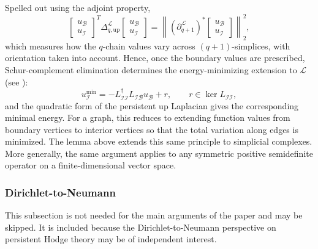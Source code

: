 \documentclass{article}
\newcommand{\LL}{\mathcal{L}}
\begin{document}
Spelled out using the adjoint property,
\[
\begin{bmatrix}u_{\mathcal{B}}\\u_{\mathcal{I}}\end{bmatrix}^T\Delta_{q,\mathrm{up}}^\LL\begin{bmatrix}u_{\mathcal{B}}\\u_{\mathcal{I}}\end{bmatrix}=\left\|(\partial_{q+1}^\LL)^*\begin{bmatrix}u_{\mathcal{B}}\\u_{\mathcal{I}}\end{bmatrix}\right\|_2^2,
\]
which measures how the $q$-chain values vary across $(q+1)$-simplices, with orientation taken into account. Hence, once the boundary values are prescribed, Schur-complement elimination determines the energy-minimizing extension to $\LL$ (see \cite[Appendix A.5.5]{MR2061575}):
\[
u_{\mathcal I}^{\min}=-L_{\mathcal I\mathcal I}^{\dagger}L_{\mathcal I\mathcal B}u_{\mathcal B}+r,\qquad r\in\ker L_{\mathcal I\mathcal I},
\]
and the quadratic form of the persistent up Laplacian gives the corresponding minimal energy. For a graph, this reduces to extending function values from boundary vertices to interior vertices so that the total variation along edges is minimized. The lemma above extends this same principle to simplicial complexes. More generally, the same argument applies to any symmetric positive semidefinite operator on a finite-dimensional vector space.

\subsubsection{Dirichlet-to-Neumann}

This subsection is not needed for the main arguments of the paper and may be skipped. It is included because the Dirichlet-to-Neumann perspective on persistent Hodge theory may be of independent interest.
\end{document}
